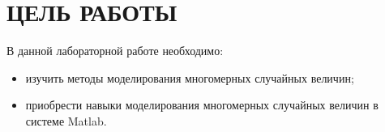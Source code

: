 \section{ЦЕЛЬ РАБОТЫ}

В данной лабораторной работе необходимо:

\begin{itemize}

\item
  изучить методы моделирования многомерных случайных величин;
\item
  приобрести навыки моделирования многомерных случайных величин в системе Matlab.

\end{itemize}
